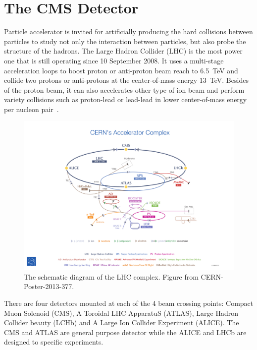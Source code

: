 \chapter{The CMS Detector} \label{chap:detector}

Particle accelerator is invited for artificially producing the hard collisions between particles to study not only the interaction between particles, but also probe the structure of the hadrons. The Large Hadron Collider (LHC) is the most power one that is still operating since 10 September 2008. It uses a multi-stage acceleration loops to boost proton or anti-proton beam reach to 6.5~TeV and collide two protons or anti-protons at the center-of-mass energy 13~TeV. Besides of the proton beam, it can also accelerates other type of ion beam and perform variety collisions such as proton-lead or lead-lead in lower center-of-mass energy per nucleon pair~\cite{Evans:2008zzb}.

\begin{figure}[ht]
  \begin{center}
    \includegraphics[width=1\textwidth]{figures/detector/LHC_complex_2013.pdf}
  \end{center}
  \caption{The schematic diagram of the LHC complex. Figure from CERN-Poster-2013-377.}
  \label{fig:lhc}
\end{figure}


There are four detectors mounted at each of the 4 beam crossing points: Compact Muon Solenoid (CMS), A Toroidal LHC ApparatuS (ATLAS), Large Hadron Collider beauty (LCHb) and A Large Ion Collider Experiment (ALICE). The CMS and ATLAS are general purpose detector while the ALICE and LHCb are designed to specific experiments. 

